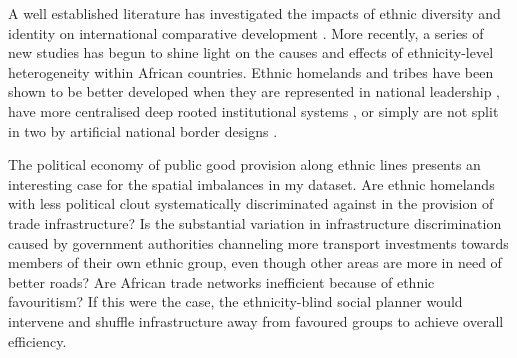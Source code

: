\documentclass[11pt, oneside]{article}   	%
\begin{document}
A well established literature has investigated the impacts of ethnic diversity and identity on international comparative development \citep{easterly_africas_1997,Alesina_EthnicDiversityEconomic_2005,gennaioli_modern_2007,Alesina_Ethnicinequality_2016}. More recently, a series of new studies has begun to shine light on the causes and effects of ethnicity-level heterogeneity within African countries. Ethnic homelands and tribes have been shown to be better developed when they are represented in national leadership \citep{Franck_DoesLeaderEthnicity_2012}, have more centralised deep rooted institutional systems \citep{michalopoulos_pre-colonial_2013}, or simply are not split in two by artificial national border designs \citep{michalopoulos_long-run_2016}.

The political economy of public good provision along ethnic lines presents an interesting case for the spatial imbalances in my dataset. Are ethnic homelands with less political clout systematically discriminated against in the provision of trade infrastructure? Is the substantial variation in infrastructure discrimination caused by government authorities channeling more transport investments towards members of their own ethnic group, even though other areas are more in need of better roads? Are African trade networks inefficient because of ethnic favouritism? If this were the case, the ethnicity-blind social planner would intervene and shuffle infrastructure away from favoured groups to achieve overall efficiency.
\end{document}
